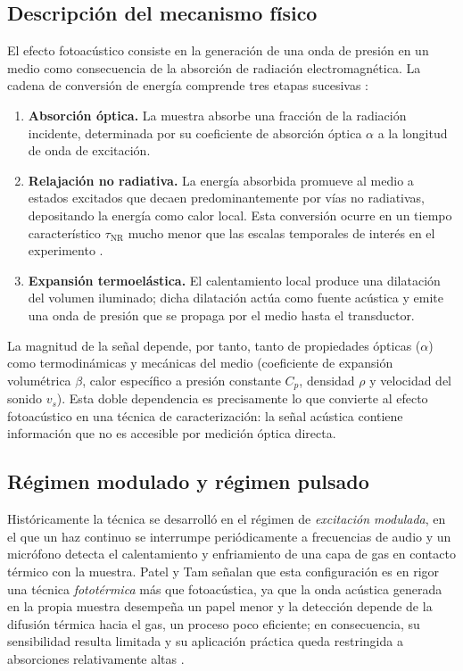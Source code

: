 \subsection*{Descripción del mecanismo físico}

El efecto fotoacústico consiste en la generación de una onda de
presión en un medio como consecuencia de la absorción de radiación
electromagnética. La cadena de conversión de energía comprende tres
etapas sucesivas \cite{Marin2008}:

\begin{enumerate}
    \item \textbf{Absorción óptica.} La muestra absorbe una fracción
    de la radiación incidente, determinada por su coeficiente de
    absorción óptica $\alpha$ a la longitud de onda de excitación.

    \item \textbf{Relajación no radiativa.} La energía absorbida
    promueve al medio a estados excitados que decaen predominantemente
    por vías no radiativas, depositando la energía como calor local.
    Esta conversión ocurre en un tiempo característico
    $\tau_\text{NR}$ mucho menor que las escalas temporales de
    interés en el experimento \cite{PatelTam1981}.

    \item \textbf{Expansión termoelástica.} El calentamiento local
    produce una dilatación del volumen iluminado; dicha dilatación
    actúa como fuente acústica y emite una onda de presión que se
    propaga por el medio hasta el transductor.
\end{enumerate}

La magnitud de la señal depende, por tanto, tanto de propiedades
ópticas ($\alpha$) como termodinámicas y mecánicas del medio
(coeficiente de expansión volumétrica $\beta$, calor específico a
presión constante $C_p$, densidad $\rho$ y velocidad del sonido
$v_s$). Esta doble dependencia es precisamente lo que convierte al
efecto fotoacústico en una técnica de caracterización: la señal
acústica contiene información que no es accesible por medición
óptica directa.

\subsection*{Régimen modulado y régimen pulsado}

Históricamente la técnica se desarrolló en el régimen de
\textit{excitación modulada}, en el que un haz continuo se interrumpe
periódicamente a frecuencias de audio y un micrófono detecta el
calentamiento y enfriamiento de una capa de gas en contacto térmico
con la muestra. Patel y Tam señalan que esta configuración es en
rigor una técnica \textit{fototérmica} más que fotoacústica, ya que
la onda acústica generada en la propia muestra desempeña un papel
menor y la detección depende de la difusión térmica hacia el gas,
un proceso poco eficiente; en consecuencia, su sensibilidad resulta
limitada y su aplicación práctica queda restringida a absorciones
relativamente altas \cite{PatelTam1981}.

